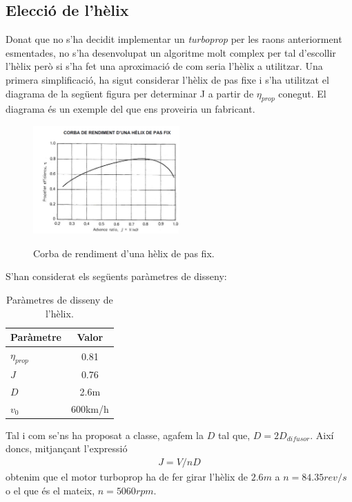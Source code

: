 \subsection{Elecció de l'hèlix}
Donat que no s'ha decidit implementar un \textit{turboprop} per les raons anteriorment esmentades, no s'ha desenvolupat un algoritme molt complex per tal d'escollir l'hèlix però si s'ha fet una aproximació de com seria l'hèlix a utilitzar. Una primera simplificació, ha sigut considerar l'hèlix de pas fixe i s'ha utilitzat el diagrama de la següent figura per determinar J a partir de $\eta_{prop}$ conegut. El diagrama és un exemple del que ens proveiria un fabricant.

\begin{figure}[H]
	\centering
	\includegraphics[width = 0.5\textwidth]{./pics/diag_helix}
	\label{diag_helix}
	\caption{Corba de rendiment d'una hèlix de pas fix.}
\end{figure}

\noindent S'han considerat els següents paràmetres de disseny:
\begin{table}[H]
	\centering
	\begin{tabular}{lc}
		\toprule[3pt]
		\textbf{Paràmetre}&\textbf{Valor}\\
		\midrule[1pt]
		$\eta_{prop}$ & 0.81\\
		$J$ & 0.76\\
		$D$ & 2.6m\\
		$v_0$&600km/h\\
				
		\bottomrule[2pt]
	\end{tabular}
	\label{helix_param}
	\caption{Paràmetres de disseny de l'hèlix.}
\end{table}
\noindent Tal i com se'ns ha proposat a classe, agafem la $D$ tal que, $D = 2D_{difusor}$. Així doncs, mitjançant l'expressió 
\begin{align}
	J = V/nD
\end{align}
obtenim que el motor turboprop ha de fer girar l'hèlix de $2.6m$ a \textbf{$n=84.35 rev/s$} o el que és el mateix, \textbf{$n=5060rpm$}.\\

